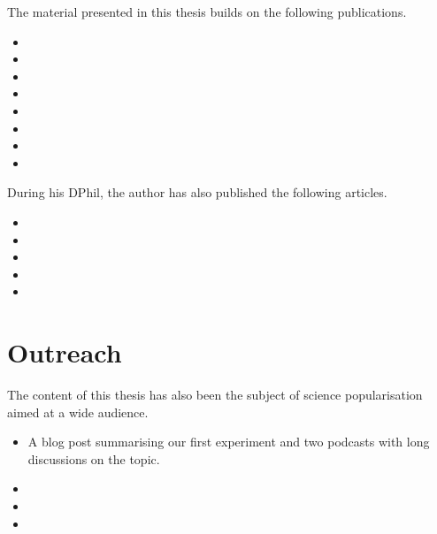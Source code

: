 The material presented in this thesis builds on the following publications.
\begin{itemize}[label={}]
\item {}\vspace{-10pt}
\item {}\vspace{-10pt}
\item {}\vspace{-10pt}
\item {}\vspace{-10pt}
\item {}\vspace{-10pt}
\item {}\vspace{-10pt}
\item {}
\item {}\vspace{5pt}
\end{itemize}\vspace{10pt}
During his DPhil, the author has also published the following articles.
\begin{itemize}[label={}]
\item {}\vspace{-10pt}
\item {}\vspace{-10pt}
\item {}\vspace{-10pt}
\item {}\vspace{-10pt}
\item {}\vspace{-10pt}
\end{itemize}

\pagebreak

\section*{Outreach}

The content of this thesis has also been the subject of science popularisation aimed at a wide audience.

\begin{itemize}
\item A blog post summarising our first experiment and two podcasts with long discussions on the topic.
\end{itemize}
\begin{itemize}[label={}]
\item {}\vspace{-10pt}
\item {}\vspace{-10pt}
\item {}\vspace{-10pt}
\end{itemize}

